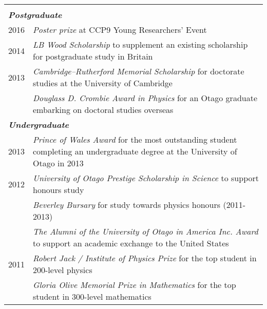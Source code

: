 \documentclass[10pt,a4paper,final]{article}
\begin{document}
\begin{table}[t!]
\begin{tabularx}{\textwidth}{l m{}}
\rowcolor{seaborn_blue}
\multicolumn{2}{l}{\large\textcolor{white}{\textbf{Scholarships, Awards, And Prizes}}} \\
\multicolumn{2}{l}{\textbf{\textit{Postgraduate}}} \\
{2016} & \textit{Poster prize} at CCP9 Young Researchers' Event \\
{2014} & \textit{LB Wood Scholarship} to supplement an existing scholarship for postgraduate study in Britain \\
{2013} & \textit{Cambridge--Rutherford Memorial Scholarship} for doctorate studies at the University of Cambridge \\
& \textit{Douglass D. Crombie Award in Physics} for an Otago graduate embarking on doctoral studies overseas \\
\multicolumn{2}{l}{\textbf{\textit{Undergraduate}}} \\
{2013} & \textit{Prince of Wales Award} for the most outstanding student completing an undergraduate degree at the University of Otago in 2013\\
{2012} & \textit{University of Otago Prestige Scholarship in Science} to support honours study\\
       & \textit{Beverley Bursary} for study towards physics honours (2011-2013)\\
       & \textit{The Alumni of the University of Otago in America Inc. Award} to support an academic exchange to the United States\\
{2011} & \textit{Robert Jack / Institute of Physics Prize} for the top student in 200-level physics\\
       & \textit{Gloria Olive Memorial Prize in Mathematics} for the top student in 300-level mathematics\\
\end{tabularx}
\end{table}
\end{document}
